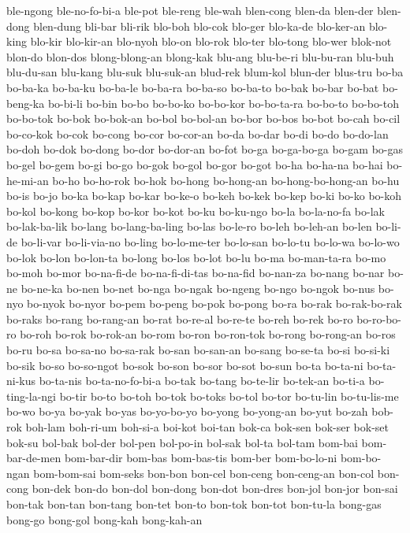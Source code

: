 {ble-ngong ble-no-fo-bi-a ble-pot ble-reng ble-wah blen-cong blen-da
blen-der blen-dong blen-dung bli-bar bli-rik blo-boh blo-cok blo-ger
blo-ka-de blo-ker-an blo-king blo-kir blo-kir-an blo-nyoh blo-on blo-rok
blo-ter blo-tong blo-wer blok-not blon-do blon-dos blong-blong-an
blong-kak blu-ang blu-be-ri blu-bu-ran blu-buh blu-du-san blu-kang blu-suk
blu-suk-an blud-rek blum-kol blun-der blus-tru bo-ba bo-ba-ka bo-ba-ku
bo-ba-le bo-ba-ra bo-ba-so bo-ba-to bo-bak bo-bar bo-bat bo-beng-ka
bo-bi-li bo-bin bo-bo bo-bo-ko bo-bo-kor bo-bo-ta-ra bo-bo-to bo-bo-toh
bo-bo-tok bo-bok bo-bok-an bo-bol bo-bol-an bo-bor bo-bos bo-bot bo-cah
bo-cil bo-co-kok bo-cok bo-cong bo-cor bo-cor-an bo-da bo-dar bo-di bo-do
bo-do-lan bo-doh bo-dok bo-dong bo-dor bo-dor-an bo-fot bo-ga bo-ga-bo-ga
bo-gam bo-gas bo-gel bo-gem bo-gi bo-go bo-gok bo-gol bo-gor bo-got bo-ha
bo-ha-na bo-hai bo-he-mi-an bo-ho bo-ho-rok bo-hok bo-hong bo-hong-an
bo-hong-bo-hong-an bo-hu bo-is bo-jo bo-ka bo-kap bo-kar bo-ke-o bo-keh
bo-kek bo-kep bo-ki bo-ko bo-koh bo-kol bo-kong bo-kop bo-kor bo-kot bo-ku
bo-ku-ngo bo-la bo-la-no-fa bo-lak bo-lak-ba-lik bo-lang bo-lang-ba-ling
bo-las bo-le-ro bo-leh bo-leh-an bo-len bo-li-de bo-li-var bo-li-via-no
bo-ling bo-lo-me-ter bo-lo-san bo-lo-tu bo-lo-wa bo-lo-wo bo-lok bo-lon
bo-lon-ta bo-long bo-los bo-lot bo-lu bo-ma bo-man-ta-ra bo-mo bo-moh
bo-mor bo-na-fi-de bo-na-fi-di-tas bo-na-fid bo-nan-za bo-nang bo-nar
bo-ne bo-ne-ka bo-nen bo-net bo-nga bo-ngak bo-ngeng bo-ngo bo-ngok bo-nus
bo-nyo bo-nyok bo-nyor bo-pem bo-peng bo-pok bo-pong bo-ra bo-rak
bo-rak-bo-rak bo-raks bo-rang bo-rang-an bo-rat bo-re-al bo-re-te bo-reh
bo-rek bo-ro bo-ro-bo-ro bo-roh bo-rok bo-rok-an bo-rom bo-ron bo-ron-tok
bo-rong bo-rong-an bo-ros bo-ru bo-sa bo-sa-no bo-sa-rak bo-san bo-san-an
bo-sang bo-se-ta bo-si bo-si-ki bo-sik bo-so bo-so-ngot bo-sok bo-son
bo-sor bo-sot bo-sun bo-ta bo-ta-ni bo-ta-ni-kus bo-ta-nis
bo-ta-no-fo-bi-a bo-tak bo-tang bo-te-lir bo-tek-an bo-ti-a bo-ting-la-ngi
bo-tir bo-to bo-toh bo-tok bo-toks bo-tol bo-tor bo-tu-lin bo-tu-lis-me
bo-wo bo-ya bo-yak bo-yas bo-yo-bo-yo bo-yong bo-yong-an bo-yut bo-zah
bob-rok boh-lam boh-ri-um boh-si-a boi-kot boi-tan bok-ca bok-sen bok-ser
bok-set bok-su bol-bak bol-der bol-pen bol-po-in bol-sak bol-ta bol-tam
bom-bai bom-bar-de-men bom-bar-dir bom-bas bom-bas-tis bom-ber
bom-bo-lo-ni bom-bo-ngan bom-bom-sai bom-seks bon-bon bon-cel bon-ceng
bon-ceng-an bon-col bon-cong bon-dek bon-do bon-dol bon-dong bon-dot
bon-dres bon-jol bon-jor bon-sai bon-tak bon-tan bon-tang bon-tet bon-to
bon-tok bon-tot bon-tu-la bong-gas bong-go bong-gol bong-kah bong-kah-an
}
